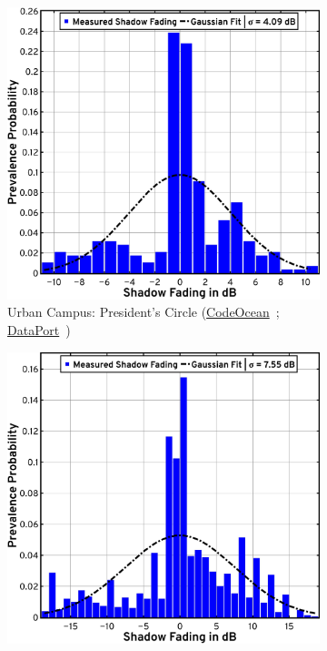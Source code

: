 \documentclass[10pt, twocolumn]{IEEEtran}
\begin{document}
{\begin{figure} [t]
    \centering
    \begin{subfigure}{0.4965\linewidth}
        \centering
        \includegraphics[width=0.95\linewidth]{figs/urban_campus_shadow_fading_1.pdf}
        \caption{Urban Campus: President's Circle (\href{https://codeocean.com/capsule/9545863/tree}{CodeOcean}~\cite{CodeOcean}; \href{http://ieee-dataport.org/12580}{DataPort}~\cite{DataPort})}
        \label{F9a}
    \end{subfigure}
    \begin{subfigure}{0.4935\linewidth}
        \centering
        \includegraphics[width=0.95\linewidth]{figs/urban_campus_shadow_fading_2.pdf}

\end{subfigure}
\end{figure}}
\end{document}
